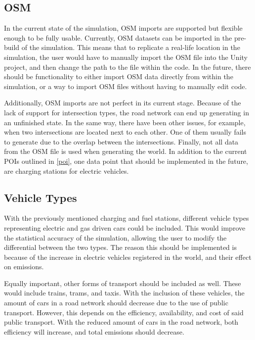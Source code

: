     \subsection{OSM}
        In the current state of the simulation, OSM imports are supported but flexible enough to be fully usable. Currently, OSM datasets can be imported in the pre-build of the simulation. This means that to replicate a real-life location in the simulation, the user would have to manually import the OSM file into the Unity project, and then change the path to the file within the code. In the future, there should be functionality to either import OSM data directly from within the simulation, or a way to import OSM files without having to manually edit code.
        
        Additionally, OSM imports are not perfect in its current stage. Because of the lack of support for intersection types, the road network can end up generating in an unfinished state. In the same way, there have been other issues, for example, when two intersections are located next to each other. One of them usually fails to generate due to the overlap between the intersections. Finally, not all data from the OSM file is used when generating the world. In addition to the current POIs outlined in \ref{poi}, one data point that should be implemented in the future, are charging stations for electric vehicles.

    \subsection{Vehicle Types}
        With the previously mentioned charging and fuel stations, different vehicle types representing electric and gas driven cars could be included. This would improve the statistical accuracy of the simulation, allowing the user to modify the differential between the two types. The reason this should be implemented is because of the increase in electric vehicles registered in the world, and their effect on emissions\cite{IEA}. 
        
        Equally important, other forms of transport should be included as well. These would include trains, trams, and taxis. With the inclusion of these vehicles, the amount of cars in a road network should decrease due to the use of public transport. However, this depends on the efficiency, availability, and cost of said public transport. With the reduced amount of cars in the road network, both efficiency will increase, and total emissions should decrease.

